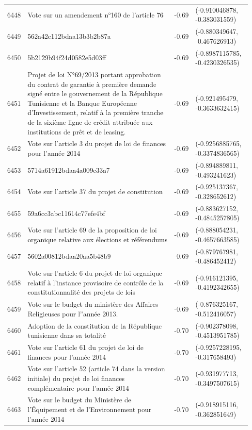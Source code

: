 \begin{table}[ht]
\begin{tabular}{rlrl}
  6448 & Vote sur un amendement n°160 de l'article 76 & -0.69 & (-0.910046878, -0.383031559) \\ 
  6449 & 562a42c112bdaa13b3b2b87a & -0.69 & (-0.880349647, -0.467626913) \\ 
  6450 & 5b2129b94f24d0582e5d03ff & -0.69 & (-0.8987115785, -0.4230326535) \\ 
  6451 & Projet de loi N°69/2013 portant approbation du contrat de garantie à première demande signé entre le gouvernement de la République Tunisienne et la Banque Européenne d'Investissement, relatif à la première tranche de la sixième ligne de crédit attribuée aux institutions de prêt et de leasing. & -0.69 & (-0.921495479, -0.3633632415) \\ 
  6452 & Vote sur l'article 3 du projet de loi de finances pour l'année 2014 & -0.69 & (-0.9256885765, -0.3374836565) \\ 
  6453 & 5714a61912bdaa4a009c33a7 & -0.69 & (-0.894889811, -0.493241623) \\ 
  6454 & Vote sur l'article 37 du projet de constitution & -0.69 & (-0.925137367, -0.328652612) \\ 
  6455 & 59a6cc3abc11614c77efe4bf & -0.69 & (-0.883627152, -0.4845257805) \\ 
  6456 & Vote sur l'article 69 de la proposition de loi organique relative aux élections et référendums & -0.69 & (-0.888054231, -0.4657663585) \\ 
  6457 & 5602a00812bdaa20aa5b48b9 & -0.69 & (-0.879767981, -0.486452412) \\ 
  6458 & Vote sur l'article 6 du projet de loi organique relatif à l'instance provisoire de contrôle de la constitutionnalité des projets de lois & -0.69 & (-0.916121395, -0.4192342655) \\ 
  6459 & Vote sur le budget du ministère des Affaires Religieuses pour l''année 2013. & -0.69 & (-0.876325167, -0.512416057) \\ 
  6460 & Adoption de la constitution de la République tunisienne dans sa totalité & -0.70 & (-0.902378098, -0.4513951785) \\ 
  6461 & Vote sur l'article 61 du projet de loi de finances pour l'année 2014 & -0.70 & (-0.9257228195, -0.317658493) \\ 
  6462 & Vote sur l'article 52 (article 74 dans la version initiale) du projet de loi finances complémentaire pour l'année 2014 & -0.70 & (-0.931977713, -0.3497507615) \\ 
  6463 & Vote sur le budget du Ministère de l'Équipement et de l'Environnement pour l'année 2014 & -0.70 & (-0.918915116, -0.362851649) \\ 

\end{tabular}
\end{table}
